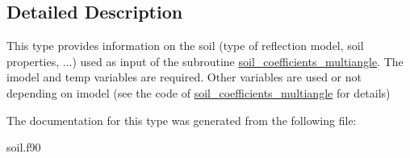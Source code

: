 \subsection{Detailed Description}
This type provides information on the soil (type of reflection model, soil properties, ...) used as input of the subroutine \hyperlink{namespacemod__soil_addfafc544d6649e3cf0bec775d55996e}{soil\_\-coefficients\_\-multiangle}. The imodel and temp variables are required. Other variables are used or not depending on imodel (see the code of \hyperlink{namespacemod__soil_addfafc544d6649e3cf0bec775d55996e}{soil\_\-coefficients\_\-multiangle} for details) 

The documentation for this type was generated from the following file:\begin{DoxyCompactItemize}
\item 
soil.f90\end{DoxyCompactItemize}
